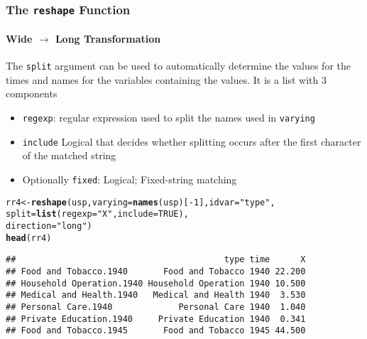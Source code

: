 \documentclass[paper=screen,mathserif]{beamer}\usepackage[]{graphicx}\usepackage[]{color}
\makeatletter
\newcommand{\hlnum}[1]{\textcolor[rgb]{0.686,0.059,0.569}{#1}}%
\newcommand{\hlstr}[1]{\textcolor[rgb]{0.192,0.494,0.8}{#1}}%
\newcommand{\hlopt}[1]{\textcolor[rgb]{0,0,0}{#1}}%
\newcommand{\hlstd}[1]{\textcolor[rgb]{0.345,0.345,0.345}{#1}}%
\newcommand{\hlkwb}[1]{\textcolor[rgb]{0.69,0.353,0.396}{#1}}%
\newcommand{\hlkwc}[1]{\textcolor[rgb]{0.333,0.667,0.333}{#1}}%
\newcommand{\hlkwd}[1]{\textcolor[rgb]{0.737,0.353,0.396}{\textbf{#1}}}%
\newenvironment{kframe}{%
 \def\at@end@of@kframe{}%
 \ifinner\ifhmode%
  \def\at@end@of@kframe{\end{minipage}}%
  \begin{minipage}{\columnwidth}%
 \fi\fi%
 \def\FrameCommand##1{\hskip\@totalleftmargin \hskip-\fboxsep
 \colorbox{shadecolor}{##1}\hskip-\fboxsep
     \hskip-\linewidth \hskip-\@totalleftmargin \hskip\columnwidth}%
 \MakeFramed {\advance\hsize-\width
   \@totalleftmargin\z@ \linewidth\hsize
   \@setminipage}}%
 {\par\unskip\endMakeFramed%
 \at@end@of@kframe}
\newenvironment{knitrout}{}{} %
\newcommand{\ft}[1]{\frametitle{#1}}
\newcommand{\fst}[1]{\framesubtitle{#1}}
\makeatother
\begin{document}
\begin{frame}[fragile]
  \ft{The {\tt reshape} Function}
  \fst{Wide $\rightarrow$ Long Transformation}

  The \verb=split= argument can be used to automatically determine the
  values for the times and names for the variables containing the
  values. It is a list with 3 components
  \begin{itemize}
  \item \verb=regexp=: regular expression used to split the names used
    in \verb=varying=
  \item \verb=include= Logical that decides whether splitting occurs
    after the first character of the matched string
  \item Optionally \verb=fixed=: Logical; Fixed-string matching
  \end{itemize} 
\begin{knitrout}\scriptsize
{}\color{fgcolor}\begin{kframe}
\begin{alltt}
\hlstd{rr4} \hlkwb{<-} \hlkwd{reshape}\hlstd{(usp,} \hlkwc{varying} \hlstd{=} \hlkwd{names}\hlstd{(usp)[}\hlopt{-}\hlnum{1}\hlstd{],} \hlkwc{idvar} \hlstd{=} \hlstr{"type"}\hlstd{,}
               \hlkwc{split} \hlstd{=} \hlkwd{list}\hlstd{(}\hlkwc{regexp} \hlstd{=} \hlstr{"X"}\hlstd{,} \hlkwc{include} \hlstd{=} \hlnum{TRUE}\hlstd{),}
               \hlkwc{direction} \hlstd{=} \hlstr{"long"}\hlstd{)}
\hlkwd{head}\hlstd{(rr4)}
\end{alltt}
\begin{verbatim}
##                                         type time      X
## Food and Tobacco.1940       Food and Tobacco 1940 22.200
## Household Operation.1940 Household Operation 1940 10.500
## Medical and Health.1940   Medical and Health 1940  3.530
## Personal Care.1940             Personal Care 1940  1.040
## Private Education.1940     Private Education 1940  0.341
## Food and Tobacco.1945       Food and Tobacco 1945 44.500
\end{verbatim}
\end{kframe}
\end{knitrout}
  
\end{frame}
\end{document}
